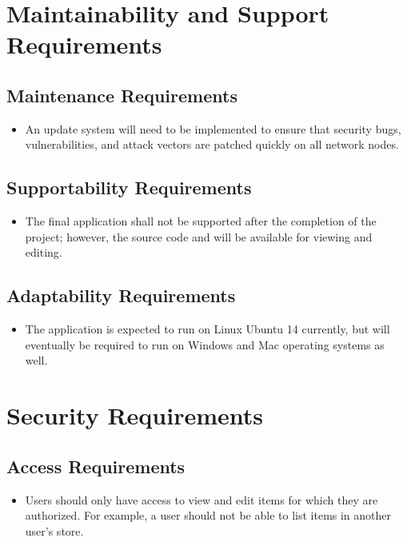 \documentclass{article}
\begin{document}
\section{Maintainability and Support Requirements}

\subsection{Maintenance Requirements}
\begin{itemize}
	\item
	An update system will need to be implemented to ensure that security bugs, vulnerabilities, and attack vectors are patched quickly on all network nodes. 
\end{itemize}

\subsection{Supportability Requirements}

\begin{itemize}
	\item
	The final application shall not be supported after the completion of the project; however, the source code and will be available for viewing and editing.
\end{itemize}

\subsection{Adaptability Requirements}

\begin{itemize}
	\item
	The application is expected to run on Linux Ubuntu 14 currently, but will eventually be required to run on Windows and Mac operating systems as well.
\end{itemize}

\section{Security Requirements}

\subsection{Access Requirements}
\begin{itemize}
	\item 
	Users should only have access to view and edit items for which they are authorized. For example, a user should not be able to list items in another user's store.   	
\end{itemize}
\end{document}
